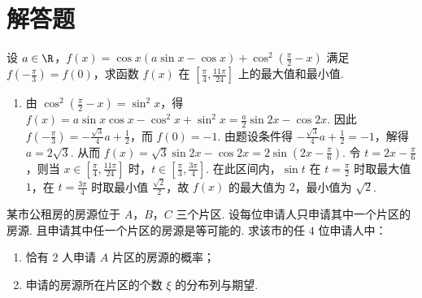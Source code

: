 \section{解答题}

\begin{problem}
设 \(a \in \R\)，\(f(x) = \cos x (a \sin x - \cos x) + \cos^2 \left(\frac{\pi}{2} - x\right)\) 满足 \(f\left(-\frac{\pi}{3}\right) = f(0)\)，求函数 \(f(x)\) 在 \(\left[\frac{\pi}{4}, \frac{11\pi}{24}\right]\) 上的最大值和最小值.
\end{problem}

\begin{solution}
\begin{enumerate}
\item 由 \(\cos^2\left(\frac{\pi}{2}-x\right)=\sin^2x\)，得 \(f(x)=a\sin x\cos x-\cos^2x+\sin^2x=\frac{a}{2}\sin 2x-\cos 2x\). 因此 \(f\left(-\frac{\pi}{3}\right)=-\frac{\sqrt{3}}{4}a+\frac{1}{2}\)，而 \(f(0)=-1\). 由题设条件得 \(-\frac{\sqrt{3}}{4}a+\frac{1}{2}=-1\)，解得 \(a=2\sqrt{3}\). 从而 \(f(x)=\sqrt{3}\sin 2x-\cos 2x=2\sin\left(2x-\frac{\pi}{6}\right)\). 令 \(t=2x-\frac{\pi}{6}\)，则当 \(x\in\left[\frac{\pi}{4},\frac{11\pi}{24}\right]\) 时，\(t\in\left[\frac{\pi}{3},\frac{3\pi}{4}\right]\). 在此区间内，\(\sin t\) 在 \(t=\frac{\pi}{2}\) 时取最大值 \(1\)，在 \(t=\frac{3\pi}{4}\) 时取最小值 \(\frac{\sqrt{2}}{2}\)，故 \(f(x)\) 的最大值为 \(2\)，最小值为 \(\sqrt{2}\).
\end{enumerate}
\end{solution}

\begin{problem}
某市公租房的房源位于 \(A\)，\(B\)，\(C\) 三个片区. 设每位申请人只申请其中一个片区的房源. 且申请其中任一个片区的房源是等可能的. 求该市的任 \(4\) 位申请人中：
\begin{enumerate}
\item 恰有 2 人申请 \(A\) 片区的房源的概率；
\item 申请的房源所在片区的个数 \(\xi\) 的分布列与期望.
\end{enumerate}
\end{problem}

